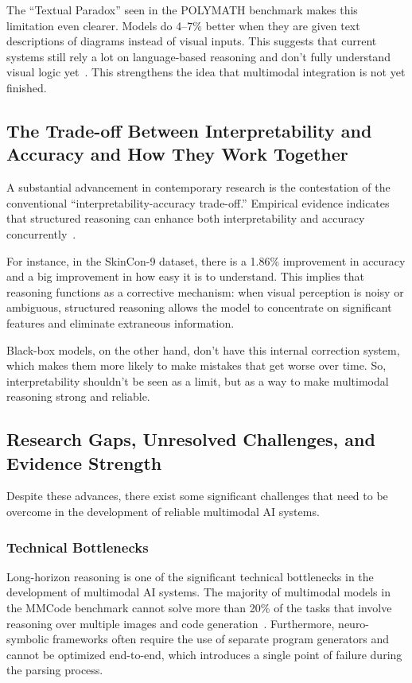 \documentclass[sigconf, nonacm]{acmart}
\begin{document}
The ``Textual Paradox'' seen in the POLYMATH benchmark makes this limitation 
even clearer. Models do 4--7\% better when they are given text descriptions 
of diagrams instead of visual inputs. This suggests that current systems still 
rely a lot on language-based reasoning and don't fully understand visual 
logic yet~\cite{gupta2024polymath}. This strengthens the idea that multimodal 
integration is not yet finished.

\subsection{The Trade-off Between Interpretability and Accuracy and How They Work Together}
A substantial advancement in contemporary research is the contestation of 
the conventional ``interpretability-accuracy trade-off.'' Empirical evidence 
indicates that structured reasoning can enhance both interpretability and 
accuracy concurrently~\cite{jiang2025wise}.

For instance, in the SkinCon-9 dataset, there is a 1.86\% improvement in 
accuracy and a big improvement in how easy it is to understand. This implies 
that reasoning functions as a corrective mechanism: when visual perception 
is noisy or ambiguous, structured reasoning allows the model to concentrate 
on significant features and eliminate extraneous information.

Black-box models, on the other hand, don't have this internal correction 
system, which makes them more likely to make mistakes that get worse over 
time. So, interpretability shouldn't be seen as a limit, but as a way to 
make multimodal reasoning strong and reliable.

\subsection{Research Gaps, Unresolved Challenges, and Evidence Strength}
Despite these advances, there exist some significant challenges that need 
to be overcome in the development of reliable multimodal AI systems.

\subsubsection{Technical Bottlenecks}
Long-horizon reasoning is one of the significant technical bottlenecks in 
the development of multimodal AI systems. The majority of multimodal models 
in the MMCode benchmark cannot solve more than 20\% of the tasks that involve 
reasoning over multiple images and code generation~\cite{li2024mmcode}. 
Furthermore, neuro-symbolic frameworks often require the use of separate program 
generators and cannot be optimized end-to-end, which introduces a 
single point of failure during the parsing process.
\end{document}
